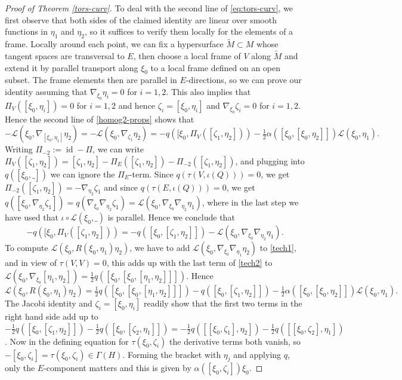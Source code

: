 \documentclass[10pt,a4paper]{amsart}
\newcommand{\id}{\operatorname{id}}
\begin{document}
\begin{proof}[Proof of Theorem \ref{tors-curv}]
    To deal with the second line of \eqref{eq:tors-curv}, we first observe that both sides of the claimed identity are linear over smooth functions in $\eta_1$ and $\eta_2$, so it suffices to verify them locally for the elements of a frame. Locally around each point, we can fix a hypersurface $\tilde M\subset M$ whose tangent spaces are transversal to $E$, then choose a local frame of $V$ along $\tilde M$ and extend it by parallel transport along $\xi_0$ to a local frame defined on an open subset. The frame elements then are parallel in $E$-directions, so we can prove our identity assuming that $\nabla_{\xi_0}\eta_i=0$ for $i=1,2$. This also implies that $\Pi_V([\xi_0,\eta_i])=0$ for $i=1,2$ and hence $\zeta_i=[\xi_0,\eta_i]$ and $\nabla_{\xi_0}\zeta_i=0$ for $i=1,2$. Hence the second line of \eqref{homog2-props} shows that 
    \begin{equation}\label{tech1}
    -\mathcal L(\xi_0,\nabla_{[\xi_0,\eta_1]}\eta_2)=-\mathcal L(\xi_0,\nabla_{\zeta_1}\eta_2)=-q([\xi_0,\Pi_V([\zeta_1,\eta_2]))-\tfrac12\alpha([\xi_0,[\xi_0,\eta_2]])\mathcal L(\xi_0,\eta_1). 
    \end{equation}
    Writing $\Pi_{-2}:=\id-\Pi$, we can write $\Pi_V([\zeta_1,\eta_2])=[\zeta_1,\eta_2]-\Pi_E([\zeta_1,\eta_2])-\Pi_{-2}([\zeta_1,\eta_2])$, and plugging into $q([\xi_0,\_])$ we can ignore the $\Pi_E$-term. Since $q(\tau(V,\iota(Q)))=0$, we get $\Pi_{-2}([\zeta_1,\eta_2])=-\nabla_{\eta_2}\zeta_1$ and since $q(\tau(E,\iota(Q)))=0$, we get $q([\xi_0,\nabla_{\eta_2}\zeta_1])=q(\nabla_{\xi_0}\nabla_{\eta_2}\zeta_1)=\mathcal L(\xi_0,\nabla_{\xi_0}\nabla_{\eta_2}\eta_1)$, where in the last step we have used that $\iota\circ \mathcal L(\xi_0,\_)$ is parallel. Hence we conclude that 
    \begin{equation}\label{tech2}
      -q([\xi_0,\Pi_V([\zeta_1,\eta_2]))=-q([\xi_0,[\zeta_1,\eta_2]])-\mathcal L(\xi_0,\nabla_{\xi_0}\nabla_{\eta_2}\eta_1). 
    \end{equation}
    To compute $\mathcal L(\xi_0,R(\xi_0,\eta_1)\eta_2)$, we have to add $\mathcal L(\xi_0,\nabla_{\xi_0}\nabla_{\eta_1}\eta_2)$ to \eqref{tech1}, and in view of $\tau(V,V)=0$, this adds up with the last term of \eqref{tech2} to $\mathcal L(\xi_0,\nabla_{\xi_0}[\eta_1,\eta_2])=\tfrac12q([\xi_0,[\xi_0,[\eta_1,\eta_2]]])$. Hence 
    \begin{equation}\label{tech3}
      \mathcal L(\xi_0,R(\xi_0,\eta_1)\eta_2)=\tfrac12q([\xi_0,[\xi_0,[\eta_1,\eta_2]]])-q([\xi_0,[\zeta_1,\eta_2]]) -\tfrac12\alpha([\xi_0,[\xi_0,\eta_2]])\mathcal L(\xi_0,\eta_1).
    \end{equation}
    The Jacobi identity and $\zeta_i=[\xi_0,\eta_i]$ readily show that the first two terms in the right hand side add up to $-\frac12 q([\xi_0,[\zeta_1,\eta_2]])-\frac12q([\xi_0,[\zeta_2,\eta_1]])=-\frac12 q([[\xi_0,\zeta_1],\eta_2])-\frac12q([[\xi_0,\zeta_2],\eta_1])$. Now in the defining equation for $\tau(\xi_0,\zeta_i)$ the derivative terms both vanish, so $-[\xi_0,\zeta_i]=\tau(\xi_0,\zeta_i)\in\Gamma(H)$. Forming the bracket with $\eta_j$ and applying $q$, only the $E$-component matters and this is given by $\alpha([\xi_0,\zeta_i])\xi_0$.  
\end{proof}    
\end{document}
